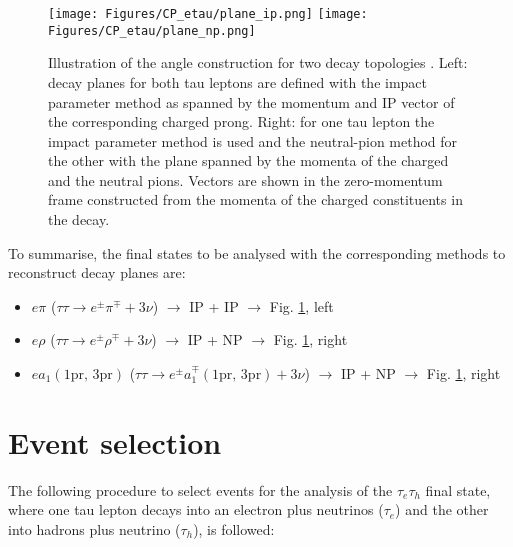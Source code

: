 \begin{figure}[t!]
    \centering
    \texttt{[image: Figures/CP\_etau/plane\_ip.png]}
    \texttt{[image: Figures/CP\_etau/plane\_np.png]}
    \caption{Illustration of the \phicp angle construction for two decay topologies \cite{CMS:2021sdq}. Left: decay planes for both tau leptons are defined with the impact parameter method as spanned by the momentum and IP vector of the corresponding charged prong. Right: for one tau lepton the impact parameter method is used and the neutral-pion method for the other with the plane spanned by the momenta of the charged and the neutral pions. Vectors are shown in the zero-momentum frame constructed from the momenta of the charged constituents in the \htt decay.}
    \label{fig:planes}
\end{figure}

To summarise, the final states to be analysed with the corresponding methods to reconstruct decay planes are:
\begin{itemize}
    \item $e\pi$ ($\tau\tau \to e^\pm \pi^\mp + 3\nu$) $\longrightarrow$ IP + IP $\longrightarrow$ Fig. \ref{fig:planes}, left
    \item $e\rho$ ($\tau\tau \to e^\pm \rho^\mp + 3\nu$) $\longrightarrow$ IP + NP $\longrightarrow$ Fig. \ref{fig:planes}, right
    \item $e a_1(\text{1pr, 3pr})$ ($\tau\tau \to e^\pm a_1^\mp(\text{1pr, 3pr}) + 3\nu$) $\longrightarrow$ IP + NP $\longrightarrow$ Fig. \ref{fig:planes}, right
\end{itemize}

\section{Event selection}\label{sec:selection}
The following procedure to select events for the analysis of the $\tau_e\tau_h$ final state, where one tau lepton decays into an electron plus neutrinos ($\tau_e$) and the other into hadrons plus neutrino ($\tau_h$), is followed:

